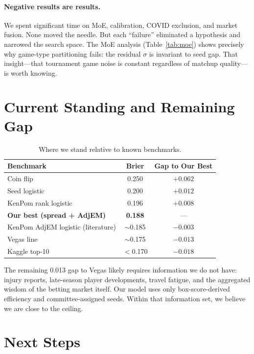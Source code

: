 \documentclass[11pt,a4paper]{article}
\begin{document}
\paragraph{Negative results are results.} We spent significant time on MoE, calibration, COVID exclusion, and market fusion. None moved the needle. But each ``failure'' eliminated a hypothesis and narrowed the search space. The MoE analysis (Table~\ref{tab:moe}) shows precisely why game-type partitioning fails: the residual $\sigma$ is invariant to seed gap. That insight---that tournament game noise is constant regardless of matchup quality---is worth knowing.


\section{Current Standing and Remaining Gap}

\begin{table}[ht]
\centering
\caption{Where we stand relative to known benchmarks.}
\label{tab:benchmarks}
\small
\begin{tabular}{@{}lcc@{}}
\toprule
\textbf{Benchmark} & \textbf{Brier} & \textbf{Gap to Our Best} \\
\midrule
Coin flip & 0.250 & $+0.062$ \\
Seed logistic & 0.200 & $+0.012$ \\
KenPom rank logistic & 0.196 & $+0.008$ \\
\textbf{Our best (spread + AdjEM)} & \textbf{0.188} & --- \\
KenPom AdjEM logistic (literature) & $\sim$0.185 & $-0.003$ \\
Vegas line & $\sim$0.175 & $-0.013$ \\
Kaggle top-10 & $<$0.170 & $-0.018$ \\
\bottomrule
\end{tabular}
\end{table}

The remaining 0.013 gap to Vegas likely requires information we do not have: injury reports, late-season player developments, travel fatigue, and the aggregated wisdom of the betting market itself. Our model uses only box-score-derived efficiency and committee-assigned seeds. Within that information set, we believe we are close to the ceiling.


\section{Next Steps}
\end{document}
